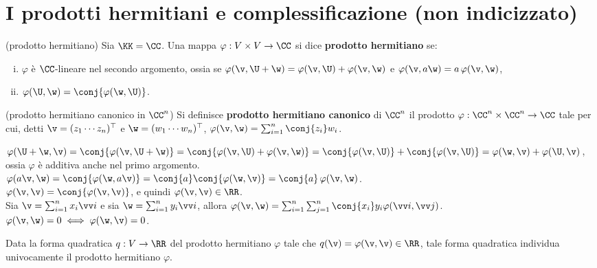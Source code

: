 \chapter{I prodotti hermitiani e complessificazione (non indicizzato)}

\begin{definition} (prodotto hermitiano) Sia $\KK = \CC$. Una mappa $\varphi : V \times V \to \CC$ si dice \textbf{prodotto hermitiano} se:
	
	\begin{enumerate}[(i)]
		\item $\varphi$ è $\CC$-lineare nel secondo argomento, ossia se $\varphi(\v, \U + \w) = \varphi(\v, \U) + \varphi(\v, \w)$ e
		$\varphi(\v, a \w) = a \, \varphi(\v, \w)$,
		\item $\varphi(\U, \w) = \conj{\varphi(\w, \U)}$.
	\end{enumerate}
\end{definition}

\begin{definition} (prodotto hermitiano canonico in $\CC^n$) Si definisce
	\textbf{prodotto hermitiano canonico} di $\CC^n$ il prodotto $\varphi : \CC^n \times \CC^n \to \CC$ tale per cui, detti $\v = (z_1 \cdots z_n)^\top$ e $\w = (w_1 \cdots w_n)^\top$, $\varphi(\v, \w) = \sum_{i=1}^n \conj{z_i} w_i$.
\end{definition}

\begin{remark}\nl
	\li $\varphi(\U + \w, \v) = \conj{\varphi(\v, \U + \w)} =
	\conj{\varphi(\v, \U) + \varphi(\v, \w)} = \conj{\varphi(\v, \U)} + \conj{\varphi(\v, \U)} = \varphi(\w, \v) + \varphi(\U, \v)$, ossia
	$\varphi$ è additiva anche nel primo argomento. \\
	\li $\varphi(a \v, \w) = \conj{\varphi(\w, a \v)} = \conj{a} \conj{\varphi(\w, \v)} = \conj{a} \, \varphi(\v, \w)$. \\
	\li $\varphi(\v, \v) = \conj{\varphi(\v, \v)}$, e quindi $\varphi(\v, \v) \in \RR$. \\
	\li Sia $\v = \sum_{i=1}^n x_i \vv i$ e sia $\w = \sum_{i=1}^n y_i \vv i$, allora $\varphi(\v, \w) = \sum_{i =1}^n \sum_{j=1}^n \conj{x_i} y_i \varphi(\vv i, \vv j)$. \\
	\li $\varphi(\v, \w) = 0 \iff \varphi(\w, \v) = 0$.
\end{remark}

\begin{proposition}
	Data la forma quadratica $q : V \to \RR$  del prodotto hermitiano $\varphi$ tale che $q(\v) = \varphi(\v, \v) \in \RR$, tale
	forma quadratica individua univocamente il prodotto hermitiano $\varphi$.
\end{proposition}


